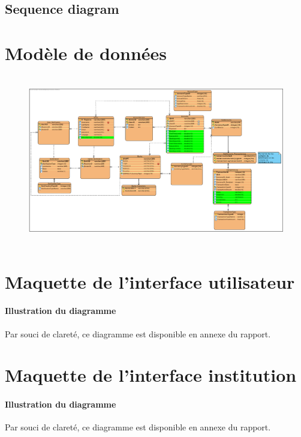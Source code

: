 \documentclass[]{report}
\begin{document}
\newpage

\subsection{Sequence diagram}

\newpage




\section{Modèle de données}



\begin{figure}[h!]
\hspace{0.75cm}
\hbox{
	\centering\includegraphics[scale=0.69]{img/Entity Relation - Extension 6.pdf} %
}
\end{figure}

\newpage




\section{Maquette de l'interface utilisateur}



\vspace*{\fill}

\paragraph{Illustration du diagramme} Par souci de clareté, ce diagramme est disponible en annexe du rapport.

\newpage


\section{Maquette de l'interface institution}



\vspace*{\fill}

\paragraph{Illustration du diagramme} Par souci de clareté, ce diagramme est disponible en annexe du rapport.
\end{document}
